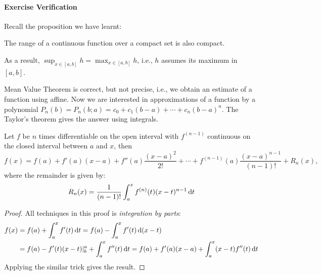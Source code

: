 \paragraph{Exercise Verification}
Recall the proposition we have learnt:
\begin{proposition}
The range of a continuous function over a compact set is also compact.
\end{proposition}

As a result, $\sup_{x\in[a,b]}h=\max_{x\in[a,b]}h$, i.e., $h$ assumes its maximum in $[a,b]$.
\begin{remark}
Mean Value Theorem is correct, but not precise, i.e., 
we obtain an estimate of a function using affine. Now we are interested in approximations of a function by a polynomial $P_n(b)=P_n(b;a)=c_0+c_1(b-a)+\cdots+c_n(b-a)^n$. The Taylor's theorem gives the answer using integrals.
\end{remark}

\begin{theorem}
Let $f$ be $n$ times differentiable on the open interval with $f^{(n-1)}$ continuous on the closed interval between $a$ and $x$, then
\[
f(x) = f(a)+f'(a)(x-a)+f''(a)\frac{(x-a)^2}{2!}+\cdots+f^{(n-1)}(a)\frac{(x-a)^{n-1}}{(n-1)!}+R_n(x),
\]
where the remainder is given by:
\[
R_n(x)=\frac{1}{(n-1)!}\int_a^xf^{(n)}(t)(x-t)^{n-1}\,\mathrm{d} t
\]
\end{theorem}
\begin{proof}
All techniques in this proof is \emph{integration by parts}:
\begin{align*}
f(x) &= f(a)+\int_a^xf'(t)\,\mathrm{d} t=f(a)-\int_a^xf'(t)\,\mathrm{d} (x-t)\\
&=f(a)-f'(t)(x-t)|_{b}^{a}+\int_a^xf''(t)\,\mathrm{d} t=f(a)+
f'(a)(x-a)+\int_a^x(x-t)f''(t)\,\mathrm{d} t
\end{align*}
Applying the similar trick gives the result.
\end{proof}
